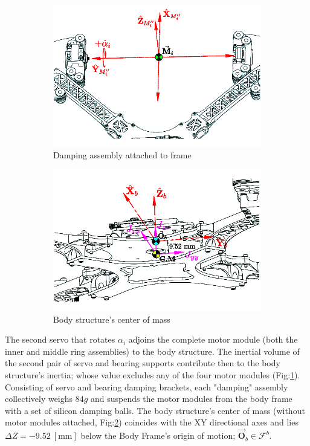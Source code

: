 \begin{figure}[hbtp]
\begin{subfigure}{0.49\textwidth}
\centering
\includegraphics[width=\textwidth]{figs/inertia-damping}
\caption{Damping assembly attached to frame}
\label{fig:inertia-damping}
\end{subfigure}
\begin{subfigure}{0.49\textwidth}
\centering
\includegraphics[width=\textwidth]{figs/inertia-center}
\caption{Body structure's center of mass}
\label{fig:inertia-center}
\end{subfigure}
\caption{}
\label{fig:damping-center}
\vspace{-15pt}
\end{figure}
\par
The second servo that rotates $\alpha_i$ adjoins the complete motor module (both the inner and middle ring assemblies) to the body structure. The inertial volume of the second pair of servo and bearing supports contribute then to the body structure's inertia; whose value excludes any of the four motor modules (Fig:\ref{fig:inertia-damping}). Consisting of servo and bearing damping brackets, each "damping" assembly collectively weighs $84g$ and suspends the motor modules from the body frame with a set of silicon damping balls. The body structure's center of mass (without motor modules attached, Fig:\ref{fig:inertia-center}) coincides with the XY directional axes and lies $\Delta Z=-9.52~[\text{mm}]$ below the Body Frame's origin of motion; $\vec{\mathbf{O}}_b\in\mathcal{F}^b$.
